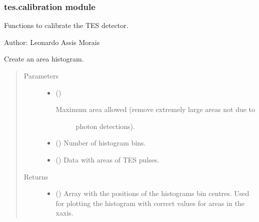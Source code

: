 \documentclass[letterpaper,10pt,english]{sphinxmanual}
\begin{document}
\subsubsection{tes.calibration module}
\label{\detokenize{tes:module-tes.calibration}}\label{\detokenize{tes:tes-calibration-module}}
\sphinxAtStartPar
Functions to calibrate the TES detector.

\sphinxAtStartPar
Author: Leonardo Assis Morais

\begin{fulllineitems}
\label{\detokenize{tes:tes.calibration.area_histogram}}
\sphinxAtStartPar
Create an area histogram.
\begin{quote}\begin{description}
\item[{Parameters}] \leavevmode\begin{itemize}
\item {} 
\sphinxAtStartPar
{} () \textendash{} \begin{description}
\item[{Maximum area allowed (remove extremely large areas not due to}] \leavevmode
\sphinxAtStartPar
photon detections).

\end{description}


\item {} 
\sphinxAtStartPar
{} () \textendash{} Number of histogram bins.

\item {} 
\sphinxAtStartPar
{} () \textendash{} Data with areas of TES pulses.

\end{itemize}

\item[{Returns}] \leavevmode
\sphinxAtStartPar
\begin{itemize}
\item {} 
\sphinxAtStartPar
{} () \textendash{} Array with the positions of the histograms bin centres.
Used for plotting the histogram with correct values
for areas in the x\sphinxhyphen{}axis.


\end{itemize}
\end{description}
\end{quote}
\end{fulllineitems}
\end{document}
